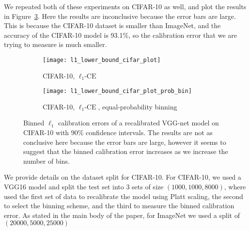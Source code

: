 We repeated both of these experiments on CIFAR-10 as well, and plot the results in Figure~\ref{fig:lower_bounds_l1_cifar}. Here the results are inconclusive because the error bars are large. This is because the CIFAR-10 dataset is smaller than ImageNet, and the accuracy of the CIFAR-10 model is 93.1\%, so the calibration error that we are trying to measure is much smaller.

\begin{figure}
     \centering
     \begin{subfigure}[b]{0.45\textwidth}
         \centering
         \texttt{[image: l1\_lower\_bound\_cifar\_plot]}
         \caption{CIFAR-10, $\ell_1\mbox{-CE}$}
         \label{fig:cifar_lower_bound_l1}
     \end{subfigure}
     \hfill
     \begin{subfigure}[b]{0.45\textwidth}
         \centering
         \texttt{[image: l1\_lower\_bound\_cifar\_plot\_prob\_bin]}
         \caption{CIFAR-10, $\ell_1\mbox{-CE}$, equal-probability binning}
         \label{fig:cifar_lower_bound_l1_prob}
     \end{subfigure}
        \caption{
        Binned $\ell_1$ calibration errors of a recalibrated VGG-net model on CIFAR-10 with $90\%$ confidence intervals. The results are not as conclusive here because the error bars are large, however it seems to suggest that the binned calibration error increases as we increase the number of bins.
        }
        \label{fig:lower_bounds_l1_cifar}
\end{figure}

We provide details on the dataset split for CIFAR-10. For CIFAR-10, we used a VGG16 model and split the test set into 3 sets of size $(1000, 1000, 8000)$, where used the first set of data to recalibrate the model using Platt scaling, the second to select the binning scheme, and the third to measure the binned calibration error. As stated in the main body of the paper, for ImageNet we used a split of $(20000, 5000, 25000)$
